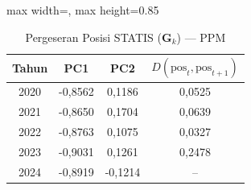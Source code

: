 \begin{table}[H]
\centering
\caption{Pergeseran Posisi STATIS ($\mathbf{G}_k$) --- PPM} \label{tab:app2jarak_statis_loading_ppm}
\begin{adjustbox}{max width=\textwidth, max height=0.85\textheight}
\begin{tabular}{|c|c|c|c|}
\hline
\textbf{Tahun} & \textbf{PC1} & \textbf{PC2} & \textbf{$D(\text{pos}_t, \text{pos}_{t+1})$} \\
\hline
2020 & -0,8562 & 0,1186 & 0,0525 \\
2021 & -0,8650 & 0,1704 & 0,0639 \\
2022 & -0,8763 & 0,1075 & 0,0327 \\
2023 & -0,9031 & 0,1261 & 0,2478 \\
2024 & -0,8919 & -0,1214 & -- \\
\hline
\end{tabular}
\end{adjustbox}
\end{table}